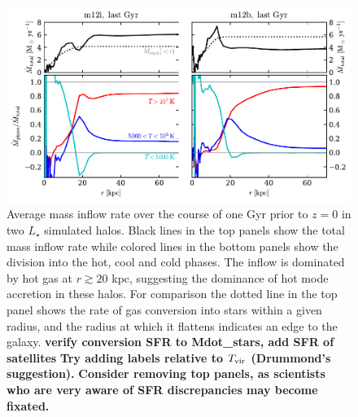 \documentclass[fleqn,usenatbib]{mnras}
\newcommand{\Rvir}{R_{\rm vir}}
\begin{document}
\begin{figure}
    \centering
    \includegraphics{figures/Mdot_normalized.pdf}
    \caption{
    Average mass inflow rate over the course of one Gyr prior to $z=0$ in two $L_\star$ simulated halos.
    Black lines in the top panels show the total mass inflow rate while colored lines in the bottom panels show the division into the hot, cool and cold phases. 
    The inflow is dominated by hot gas at $r\gtrsim 20 $ kpc, suggesting the dominance of hot mode accretion in these halos.
    For comparison the dotted line in the top panel shows the rate of gas conversion into stars within a given radius, and the radius at which it flattens indicates an edge to the galaxy.
    \textbf{verify conversion SFR to Mdot\_stars, add SFR of satellites}
    \textbf{Try adding labels relative to $T_{\rm vir}$ (Drummond's suggestion).}
    \textbf{Consider removing top panels, as scientists who are very aware of SFR discrepancies may become fixated.}
    }
    \label{f: Mdot}
\end{figure}
\end{document}
